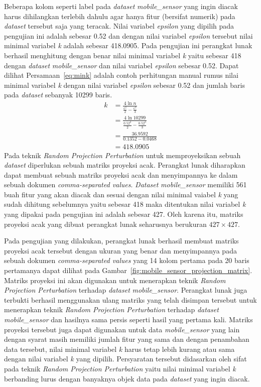 Beberapa kolom seperti label pada \textit{dataset} \textit{mobile\_sensor} yang ingin diacak harus dihilangkan terlebih dahulu agar hanya fitur (bersifat numerik) pada \textit{dataset} tersebut saja yang teracak. Nilai variabel \textit{epsilon} yang dipilih pada pengujian ini adalah sebesar 0.52 dan dengan nilai variabel \textit{epsilon} tersebut nilai minimal variabel \textit{k} adalah sebesar 418.0905. Pada pengujian ini perangkat lunak berhasil menghitung dengan benar nilai minimal variabel \textit{k} yaitu sebesar 418 dengan \textit{dataset} \textit{mobile\_sensor} dan nilai variabel \textit{epsilon} sebesar 0.52. Dapat dilihat Persamaan~\ref{eq:mink} adalah contoh perhitungan manual rumus nilai minimal variabel \textit{k} dengan nilai variabel \textit{epsilon} sebesar 0.52 dan jumlah baris pada \textit{dataset} sebanyak 10299 baris.
\begin{align}
	k &= \frac{4\ln{n}}{\frac{\epsilon^{2}}{2}-\frac{\epsilon^{3}}{3}} \label{eq:mink}\\
	&= \frac{4\ln{10299}}{\frac{0.52^{2}}{2}-\frac{0.52^{3}}{3}} \nonumber\\
	&= \frac{36.9592}{0.1352-0.0468} \nonumber\\
	&= 418.0905 \nonumber
\end{align}
Pada teknik \textit{Random Projection Perturbation} untuk memproyeksikan sebuah \textit{dataset} diperlukan sebuah matriks proyeksi acak. Perangkat lunak diharapkan dapat membuat sebuah matriks proyeksi acak dan menyimpannya ke dalam sebuah dokumen \textit{comma-separated values}. \textit{Dataset} \textit{mobile\_sensor} memiliki 561 buah fitur yang akan diacak dan sesuai dengan nilai minimal vaiabel \textit{k} yang sudah dihitung sebelumnya yaitu sebesar 418 maka ditentukan nilai variabel \textit{k} yang dipakai pada pengujian ini adalah sebesar 427. Oleh karena itu, matriks proyeksi acak yang dibuat perangkat lunak seharusnya berukuran \(427\times427\).

Pada pengujian yang dilakukan, perangkat lunak berhasil membuat matriks proyeksi acak tersebut dengan ukuran yang benar dan menyimpannya pada sebuah dokumen \textit{comma-separated values} yang 14 kolom pertama pada 20 baris pertamanya dapat dilihat pada Gambar~\ref{fig:mobile_sensor_projection_matrix}. Matriks proyeksi ini akan digunakan untuk menerapkan teknik \textit{Random Projection Perturbation} terhadap \textit{dataset} \textit{mobile\_sensor}. Perangkat lunak juga terbukti berhasil menggunakan ulang matriks yang telah disimpan tersebut untuk menerapkan teknik \textit{Random Projection Perturbation} terhadap \textit{dataset} \textit{mobile\_sensor} dan hasilnya sama persis seperti hasil yang pertama kali. Matriks proyeksi tersebut juga dapat digunakan untuk data \textit{mobile\_sensor} yang lain dengan syarat masih memiliki jumlah fitur yang sama dan dengan penambahan data tersebut, nilai minimal variabel \textit{k} harus tetap lebih kurang atau sama dengan nilai variabel \textit{k} yang dipilih. Persyaratan tersebut didasarkan oleh sifat pada teknik \textit{Random Projection Perturbation} yaitu nilai minimal variabel \textit{k} berbanding lurus dengan banyaknya objek data pada \textit{dataset} yang ingin diacak.

